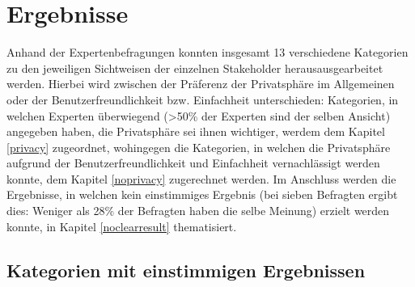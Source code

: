 \chapter{Ergebnisse} %
\label{Results} %
Anhand der Expertenbefragungen konnten insgesamt 13 verschiedene Kategorien zu den jeweiligen Sichtweisen der einzelnen Stakeholder herausausgearbeitet werden. Hierbei wird zwischen
der Präferenz der Privatsphäre im Allgemeinen oder der Benutzerfreundlichkeit bzw. Einfachheit unterschieden: Kategorien, in welchen Experten überwiegend
(>50\% der Experten sind der selben Ansicht) angegeben haben, die Privatsphäre sei ihnen wichtiger, werdem dem Kapitel \ref{privacy} zugeordnet, wohingegen die Kategorien, in welchen die Privatsphäre
aufgrund der Benutzerfreundlichkeit und Einfachheit vernachlässigt werden konnte, dem Kapitel \ref{noprivacy} zugerechnet werden. Im Anschluss werden die Ergebnisse,
in welchen kein einstimmiges Ergebnis (bei sieben Befragten ergibt dies: Weniger als 28\% der Befragten haben die selbe Meinung) erzielt werden konnte, in Kapitel \ref{noclearresult} thematisiert.

\section{Kategorien mit einstimmigen Ergebnissen}
